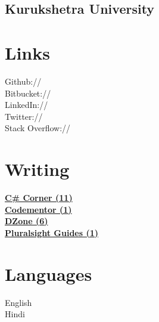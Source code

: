 \documentclass[]{gagan-resume}
\begin{document}
\begin{minipage}[t]{0.33\textwidth}
\subsection{Kurukshetra University}
\sectionsep




\section{Links} 
Github:// \href{https://github.com/sikrigagan}{} \\
Bitbucket:// \href{https://bitbucket.org/sikrigagan}{} \\
LinkedIn://  \href{https://www.linkedin.com/in/sikrigagan}{} \\
Twitter://  \href{https://twitter.com/sikrigagan}{} \\
Stack Overflow://  \href{https://stackoverflow.com/users/4129965/sikrigagan}{}
\sectionsep



\section{Writing} 
\textbf{\href{http://www.c-sharpcorner.com/members/gagan-sikri}{C\# Corner (11)}}\\
\textbf{\href{https://www.codementor.io/sikrigagan}{Codementor (1)}}\\
\textbf{\href{https://dzone.com/users/2733735/sikrigagan.html}{DZone (6)}}\\
\textbf{\href{https://www.pluralsight.com/guides/author/sikrigagan}{Pluralsight Guides (1)}}\\
\sectionsep




\section{Languages}
English \\
Hindi \\
\sectionsep





\end{minipage}
\end{document}
